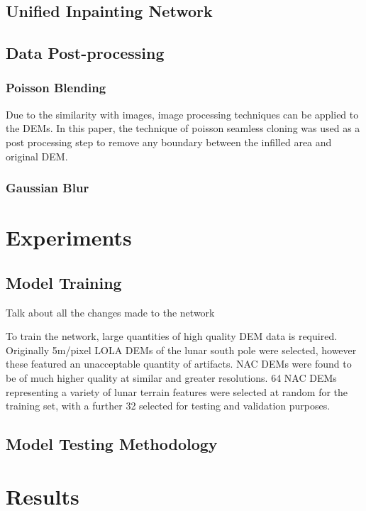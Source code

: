 \documentclass[twocolumn]{article}
\begin{document}
\subsection{Unified Inpainting Network}
\label{sec:orgaf89774}
\subsection{Data Post-processing}
\label{sec:org8c53ee0}
\subsubsection{Poisson Blending}
\label{sec:org39e4039}
Due to the similarity with images, image processing techniques can be applied to the DEMs.
In this paper, the technique of poisson seamless cloning\autocite{perezPoissonImageEditing2003} was used as a post processing step to remove any boundary between the infilled area and original DEM.

\subsubsection{Gaussian Blur}
\label{sec:org164e23d}


\section{Experiments}
\label{sec:org40c9d01}
\subsection{Model Training}
\label{sec:orged3a35a}
Talk about all the changes made to the network

To train the network, large quantities of high quality DEM data is required.
Originally 5m/pixel LOLA DEMs of the lunar south pole were selected, however these featured an unacceptable quantity of artifacts.
NAC DEMs were found to be of much higher quality at similar and greater resolutions.
64 NAC DEMs\autocite{LROCRDRProduct} representing a variety of lunar terrain features were selected at random for the training set, with a further 32 selected for testing and validation purposes.
\subsection{Model Testing Methodology}
\label{sec:org086199b}


\section{Results}
\label{sec:org7b17a2a}
\end{document}
